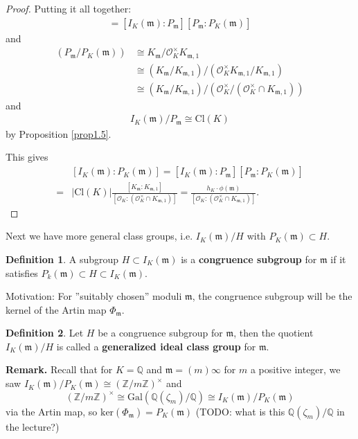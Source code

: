 \documentclass{article}
\theoremstyle{definition}
\newtheorem{defn}{Definition}[section]
\begin{document}
\begin{proof}
    Putting it all together:
    \begin{align*}
        [I_K(\mathfrak{m}):P_K(\mathfrak{m})] = [I_K(\mathfrak{m}):P_{\mathfrak{m}}][P_{\mathfrak{m}}:P_K(\mathfrak{m})]
    \end{align*}
    and \begin{align*}
        (P_\mathfrak{m}/P_K(\mathfrak{m})) &\cong K_{\mathfrak{m}}/\mathcal{O}_K^\times K_{\mathfrak{m},1} \\
        &\cong (K_{\mathfrak{m}}/K_{\mathfrak{m},1})/(\mathcal{O}_K^\times K_{\mathfrak{m},1}/K_{\mathfrak{m},1}) \\
        &\cong (K_{\mathfrak{m}}/K_{\mathfrak{m},1})/(\mathcal{O}_K^\times/(\mathcal{O}_K^\times \cap K_{\mathfrak{m},1}))
    \end{align*}
    and \begin{align*}
        I_K(\mathfrak{m})/P_\mathfrak{m} \cong \text{Cl}(K)
    \end{align*}
    by Proposition \ref{prop1.5}.
    \vspace{1mm}
     
    This gives 
    \begin{align*}
        &[I_K(\mathfrak{m}) : P_K(\mathfrak{m})] = [I_K(\mathfrak{m}) : P_{\mathfrak{m}}][P_\mathfrak{m} : P_K(\mathfrak{m})] \\
        =& |\text{Cl}(K)| \frac{[K_{\mathfrak{m}}:K_{\mathfrak{m},1}]}{[\mathcal{O}_K: (\mathcal{O}_K^\times \cap K_{\mathfrak{m},1})]} = \frac{h_K \cdot \phi(\mathfrak{\mathfrak{m}})}{[\mathcal{O}_K : (\mathcal{O}_K^\times \cap K_{\mathfrak{m},1})]}.
    \end{align*}
\end{proof}
Next we have more general class groups, i.e. $I_K(\mathfrak{m})/H$ with $P_K(\mathfrak{m}) \subset H$.
\begin{defn}
    A subgroup $H \subset I_K(\mathfrak{m})$ is a \textbf{congruence subgroup} for $\mathfrak{m}$ if it satisfies $P_k(\mathfrak{m}) \subset  H \subset I_K(\mathfrak{m})$.
\end{defn}
Motivation: For ''suitably chosen'' moduli $\mathfrak{m}$, the congruence subgroup will be the kernel of the Artin map $\Phi_{\mathfrak{m}}$.

\begin{defn}
    Let $H$ be a congruence subgroup for $\mathfrak{m}$, then the quotient $I_K(\mathfrak{m})/H$ is called a \textbf{generalized ideal class group} for $\mathfrak{m}$.
\end{defn}
\textbf{Remark.} Recall that for $K=\mathbb{Q}$ and $\mathfrak{m}=(m)\infty$ for $m$ a positive integer, we saw $I_K(\mathfrak{m})/P_K(\mathfrak{m}) \cong (\mathbb{Z}/m\mathbb{Z})^\times$ and \[
(\mathbb{Z}/m\mathbb{Z})^\times \cong \text{Gal}(\mathbb{Q}(\zeta_m)/\mathbb{Q}) \cong I_K(\mathfrak{m})/P_K(\mathfrak{m})
\]
via the Artin map, so $\text{ker}(\Phi_\mathfrak{m}) = P_K(\mathfrak{m})$ (TODO: what is this $\mathbb{Q}(\zeta_m)/\mathbb{Q}$ in the lecture?)
\vspace{1mm}
 
\end{document}
